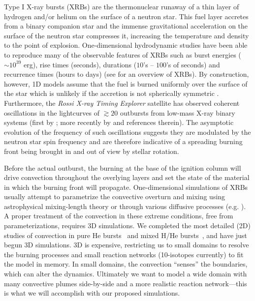 Type I X-ray bursts (XRBs) are the thermonuclear runaway of a thin 
layer of hydrogen and/or helium on the surface of a neutron star. 
This fuel layer accretes from a binary companion star and the immense
gravitational acceleration on the surface of the neutron star
compresses it, increasing the temperature and density to the point of
explosion.  One-dimensional hydrodynamic studies have been able to
reproduce many of the observable features of XRBs such as burst
energies ($\sim 10^{39}$ erg), rise times (seconds), durations ($10$'s
-- $100$'s of seconds) and recurrence times (hours to days) (see
\cite{STRO_BILD06} for an overview of XRBs).  By construction,
however, 1D models assume that the fuel is burned
uniformly over the surface of the star which is unlikely if the
accretion is not spherically symmetric \cite{SHARA82}.  Furthermore,
the {\em Rossi X-ray Timing Explorer} satellite has observed coherent
oscillations in the lightcurves of $\gtrsim 20$ outbursts from low-mass
X-ray binary
systems (first by \cite{STRO_ETAL96}; more recently by
\cite{ALTAMIRANO_ETAL10} and references therein).  The asymptotic
evolution of the frequency of such oscillations suggests they are
modulated by the neutron star spin frequency \cite{MUNO_ETAL02} and
are therefore indicative of a spreading burning front being brought in
and out of view by stellar rotation.

Before the actual outburst, the burning at the base of the ignition
column will drive convection throughout the overlying layers and set
the state of the material in which the burning front will propagate.
One-dimensional simulations of XRBs usually attempt to parametrize the
convective overturn and mixing using astrophysical mixing-length
theory or through various diffusive processes
(e.g. \cite{HEGER_ETAL00}).  A proper treatment of the convection in
these extreme conditions, free from parameterizations, requires 3D
simulations.  We completed the most detailed (2D) studies of
convection in pure He bursts~\cite{XRB-paper} and mixed H/He
bursts~\cite{XRB2}, and have just begun 3D simulations.  3D is
expensive, restricting us to small domains to resolve the burning
processes and small reaction networks (10-isotopes currently) to fit
the model in memory.  In small domains, the convection ``senses'' 
the boundaries, which can alter the dynamics.  Ultimately we want
to model a wide domain with many convective plumes side-by-side
and a more realistic reaction network---this is what we will
accomplish with our proposed simulations.

